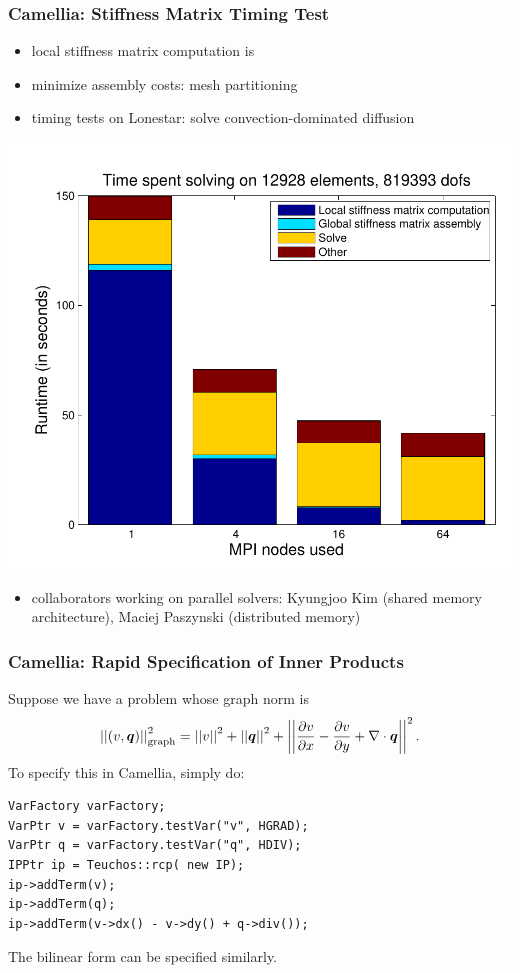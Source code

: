 \documentclass[mathserif]{beamer}
\newcommand{\vect}[1]{\ensuremath\boldsymbol{#1}}
\newcommand{\NVRnorm}[1]{\left|\left|#1\right|\right|}
\newcommand{\NVRgrad}{\nabla}
\newcommand{\NVRdiv}{\NVRgrad \cdot}
\newcommand{\NVRpd}[2]{\frac{\partial#1}{\partial#2}}
\newcommand{\pecosbold}[1]{{\color{pecos2}{#1}}}
\begin{document}
\begin{frame}
\frametitle{Camellia: Stiffness Matrix Timing Test}
\begin{itemize}
\item local stiffness matrix computation is \pecosbold{embarrassingly parallel}
\item minimize assembly costs: \pecosbold{spatially local} mesh partitioning
\item timing tests on Lonestar: solve convection-dominated diffusion
\end{itemize}
\vspace{-5mm}
\begin{center}
\includegraphics[scale = 0.40]{../figs/scalingFigs/bar_ref3.pdf}\hspace{1cm}
\end{center}
\begin{itemize}
\vspace{-5mm}
\item collaborators working on parallel solvers: Kyungjoo Kim (shared memory architecture),  Maciej Paszynski (distributed memory)
\end{itemize}

\end{frame}


\begin{frame}[fragile]
\frametitle{Camellia: Rapid Specification of Inner Products}
Suppose we have a problem whose graph norm is
\[
\NVRnorm{(v,\vect{q})}_{\rm graph}^{2} = \NVRnorm{v}^{2} + \NVRnorm{\vect{q}}^{2} + \NVRnorm{\NVRpd{v}{x} - \NVRpd{v}{y} + \NVRdiv \vect{q}}^{2}.
\]
\vspace{2mm}
To specify this in Camellia, simply do:
\begin{lstlisting}
VarFactory varFactory;
VarPtr v = varFactory.testVar("v", HGRAD);
VarPtr q = varFactory.testVar("q", HDIV);
IPPtr ip = Teuchos::rcp( new IP);
ip->addTerm(v);
ip->addTerm(q);
ip->addTerm(v->dx() - v->dy() + q->div());
\end{lstlisting}

The bilinear form can be specified similarly.

\end{frame}
\end{document}
